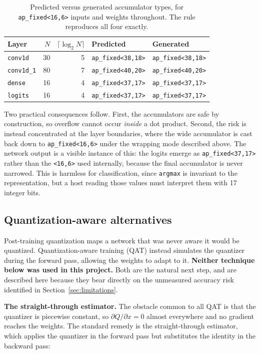\documentclass[11pt,a4paper]{article}
\begin{document}
\begin{table}[h]
\centering
\begin{tabular}{lrrll}
\toprule
\textbf{Layer} & \textbf{$N$} & \textbf{$\lceil \log_2 N \rceil$} &
\textbf{Predicted} & \textbf{Generated} \\
\midrule
\texttt{conv1d}    & 30 & 5 & \texttt{ap\_fixed<38,18>} & \texttt{ap\_fixed<38,18>} \\
\texttt{conv1d\_1} & 80 & 7 & \texttt{ap\_fixed<40,20>} & \texttt{ap\_fixed<40,20>} \\
\texttt{dense}     & 16 & 4 & \texttt{ap\_fixed<37,17>} & \texttt{ap\_fixed<37,17>} \\
\texttt{logits}    & 16 & 4 & \texttt{ap\_fixed<37,17>} & \texttt{ap\_fixed<37,17>} \\
\bottomrule
\end{tabular}
\caption{Predicted versus generated accumulator types, for
\texttt{ap\_fixed<16,6>} inputs and weights throughout. The rule reproduces all
four exactly.}
\end{table}

Two practical consequences follow. First, the accumulators are safe by
construction, so overflow cannot occur \emph{inside} a dot product. Second, the
risk is instead concentrated at the layer boundaries, where the wide
accumulator is cast back down to \texttt{ap\_fixed<16,6>} under the wrapping
mode described above. The network output is a visible instance of this: the
logits emerge as \texttt{ap\_fixed<37,17>} rather than the \texttt{<16,6>} used
internally, because the final accumulator is never narrowed. This is harmless
for classification, since \texttt{argmax} is invariant to the representation,
but a host reading those values must interpret them with 17 integer bits.

\subsection{Quantization-aware alternatives}
\label{sec:qat}

Post-training quantization maps a network that was never aware it would be
quantized. Quantization-aware training (QAT) instead simulates the quantizer
during the forward pass, allowing the weights to adapt to it. \textbf{Neither
technique below was used in this project.} Both are the natural next step, and
are described here because they bear directly on the unmeasured accuracy risk
identified in Section~\ref{sec:limitations}.

\textbf{The straight-through estimator.} The obstacle common to all QAT is that
the quantizer is piecewise constant, so $\partial Q / \partial x = 0$ almost
everywhere and no gradient reaches the weights. The standard remedy is the
straight-through estimator, which applies the quantizer in the forward pass but
substitutes the identity in the backward pass:
\end{document}

